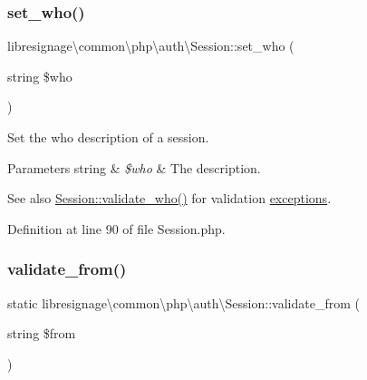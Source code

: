 \subsubsection{\texorpdfstring{set\+\_\+who()}{set\_who()}}
{\footnotesize\ttfamily libresignage\textbackslash{}common\textbackslash{}php\textbackslash{}auth\textbackslash{}\+Session\+::set\+\_\+who (\begin{DoxyParamCaption}\item[{string}]{\$who }\end{DoxyParamCaption})}

Set the \textquotesingle{}who\textquotesingle{} description of a session.


\begin{DoxyParams}[1]{Parameters}
string & {\em \$who} & The description.\\
\hline
\end{DoxyParams}
\begin{DoxySeeAlso}{See also}
\hyperlink{classlibresignage_1_1common_1_1php_1_1auth_1_1Session_ad7ad1a89f565dda93e490fab1af105b9}{Session\+::validate\+\_\+who()} for validation \hyperlink{namespacelibresignage_1_1common_1_1php_1_1auth_1_1exceptions}{exceptions}. 
\end{DoxySeeAlso}


Definition at line 90 of file Session.\+php.

\mbox{\label{classlibresignage_1_1common_1_1php_1_1auth_1_1Session_ac97b11d3fc056bc0cfdabde4b4d84911}} 
\subsubsection{\texorpdfstring{validate\+\_\+from()}{validate\_from()}}
{\footnotesize\ttfamily static libresignage\textbackslash{}common\textbackslash{}php\textbackslash{}auth\textbackslash{}\+Session\+::validate\+\_\+from (\begin{DoxyParamCaption}\item[{string}]{\$from }\end{DoxyParamCaption})\hspace{0.3cm}{\ttfamily [static]}}

